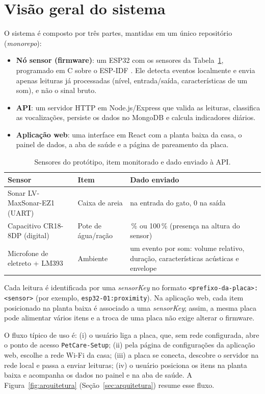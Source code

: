 \section{Visão geral do sistema}
\label{sec:visao}

O sistema é composto por três partes, mantidas em um único repositório (\textit{monorepo}):

\begin{itemize}
  \item \textbf{Nó sensor (firmware)}: um ESP32 com os sensores da Tabela~\ref{tab:sensores}, programado em C sobre o ESP-IDF \citep{espidf}. Ele detecta eventos localmente e envia apenas leituras já processadas (nível, entrada/saída, características de um som), e não o sinal bruto.
  \item \textbf{API}: um servidor HTTP em Node.js/Express \citep{nodejs,express} que valida as leituras, classifica as vocalizações, persiste os dados no MongoDB \citep{mongodb} e calcula indicadores diários.
  \item \textbf{Aplicação web}: uma interface em React \citep{react} com a planta baixa da casa, o painel de dados, a aba de saúde e a página de pareamento da placa.
\end{itemize}

\begin{table}[!ht]
\caption{Sensores do protótipo, item monitorado e dado enviado à API.}
\label{tab:sensores}
\centering
\small
\begin{tabularx}{\linewidth}{>{\hsize=0.943\hsize\raggedright\arraybackslash}X>{\hsize=0.857\hsize\raggedright\arraybackslash}X>{\hsize=1.200\hsize\raggedright\arraybackslash}X}
\toprule
\textbf{Sensor} & \textbf{Item} & \textbf{Dado enviado} \\
\midrule
Sonar LV-MaxSonar-EZ1 (UART) & Caixa de areia & 1 na entrada do gato, 0 na saída \\
Capacitivo CR18-8DP (digital) & Pote de água/ração & 0\,\% ou 100\,\% (presença na altura do sensor) \\
Microfone de eletreto + LM393 & Ambiente & um evento por som: volume relativo, duração, características acústicas e envelope \\
\bottomrule
\end{tabularx}
\end{table}

Cada leitura é identificada por uma \textit{sensorKey} no formato \texttt{<prefixo-da-placa>:<sensor>} (por exemplo, \texttt{esp32-01:proximity}). Na aplicação web, cada item posicionado na planta baixa é associado a uma \textit{sensorKey}; assim, a mesma placa pode alimentar vários itens e a troca de uma placa não exige alterar o firmware.

O fluxo típico de uso é: (i) o usuário liga a placa, que, sem rede configurada, abre o ponto de acesso \texttt{PetCare-Setup}; (ii) pela página de configurações da aplicação web, escolhe a rede Wi-Fi da casa; (iii) a placa se conecta, descobre o servidor na rede local e passa a enviar leituras; (iv) o usuário posiciona os itens na planta baixa e acompanha os dados no painel e na aba de saúde. A Figura~\ref{fig:arquitetura} (Seção~\ref{sec:arquitetura}) resume esse fluxo.
